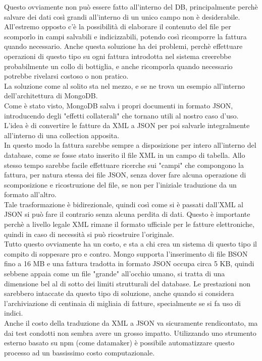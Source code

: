 \noindent Questo ovviamente non può essere fatto all'interno del DB, principalmente perchè salvare dei dati così grandi all'interno di un unico campo non è desiderabile.\\
All'estremo opposto c'è la possibilità di elaborare il contenuto del file per scomporlo in campi salvabili e indicizzabili, potendo così ricomporre la fattura quando necessario. Anche questa soluzione ha dei problemi, perchè effettuare operazioni di questo tipo su ogni fattura introdotta nel sistema creerebbe probabilmente un collo di bottiglia, e anche ricomporla quando necessario potrebbe rivelarsi costoso o non pratico.\\

\noindent La soluzione come al solito sta nel mezzo, e se ne trova un esempio all'interno dell'architettura di MongoDB.\\
Come è stato visto, MongoDB salva i propri documenti in formato JSON, introducendo degli "effetti collaterali" che tornano utili al nostro caso d'uso.\\
L'idea è di convertire le fatture da XML a JSON per poi salvarle integralmente all'interno di una collection apposita.\\
In questo modo la fattura sarebbe sempre a disposizione per intero all'interno del database, come se fosse stato inserito il file XML in un campo di tabella. Allo stesso tempo sarebbe facile effettuare ricerche sui "campi" che compongono la fattura, per natura stessa dei file JSON, senza dover fare alcuna operazione di scomposizione e ricostruzione del file, se non per l'iniziale traduzione da un formato all'altro.\\

\noindent Tale trasformazione è bidirezionale, quindi così come si è passati dall'XML al JSON si può fare il contrario senza alcuna perdita di dati. Questo è importante perchè a livello legale XML rimane il formato ufficiale per le fatture elettroniche, quindi in caso di necessità si può ricostruire l'originale.\\

\noindent Tutto questo ovviamente ha un costo, e sta a chi crea un sistema di questo tipo il compito di soppesare pro e contro. Mongo supporta l'inserimento di file BSON fino a 16 MB e una fattura tradotta in formato JSON occupa circa 5 KB, quindi sebbene appaia come un file "grande" all'occhio umano, si tratta di una dimensione bel al di sotto dei limiti strutturali del database. Le prestazioni non sarebbero intaccate da questo tipo di soluzione, anche quando si considera l'archiviazione di centinaia di migliaia di fatture, specialmente se si fa uso di indici.\\
Anche il costo della traduzione da XML a JSON va sicuramente rendicontato, ma dai test condotti non sembra avere un grosso impatto. Utilizzando uno strumento esterno basato su npm (come datamaker) è possibile automatizzare questo processo ad un bassissimo costo computazionale.\\


